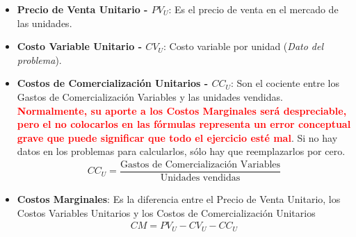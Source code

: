 \documentclass[12pt,a4paper]{article}
\begin{document}
        \begin{itemize}
        
        	\item	\textbf{Precio de Venta Unitario - ${PV}_{U}$}: Es el precio de venta en el mercado de las unidades.
            \item	\textbf{Costo Variable Unitario - ${CV}_{U}$}: Costo variable por unidad (\textsl{Dato del problema}).
            
            \item	\textbf{Costos de Comercialización Unitarios - ${CC}_{U}$}: Son el cociente entre los Gastos de Comercialización Variables y las unidades vendidas. \textbf{\textcolor{red}{Normalmente, su aporte a los Costos Marginales será despreciable, pero el no colocarlos en las fórmulas representa un error conceptual grave que puede significar que todo el ejercicio esté mal}}. Si no hay datos en los problemas para calcularlos, sólo hay que reemplazarlos por cero.
            		\begin{align}
                    	{CC}_{U} = \dfrac{\text{Gastos de Comercialización Variables}}{\text{Unidades vendidas}}
                        \label{CCU}
					\end{align}
            		
			\item	\textbf{Costos Marginales}: Es la diferencia entre el Precio de Venta Unitario, los Costos Variables Unitarios y los Costos de Comercialización Unitarios
            		\begin{align}
                    	CM = {PV}_{U} - {CV}_{U} - {CC}_{U}
                        \label{Costos_marginales}
					\end{align}
                    

\end{itemize}
\end{document}
